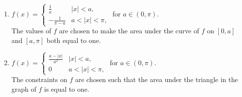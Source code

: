 \documentclass[../hw5]{subfiles}
\begin{document}
\begin{problem}
\begin{enumerate}
	\item $f(x)=\begin{cases}
			      \frac{1}{a} & |x|<a, \\ -\frac{1}{\pi-a} & a < |x| < \pi,
		      \end{cases}$ for $a \in (0,\pi)$. \\
	      The values of $f$ are chosen to make the area under the curve of $f$  on $[0,a]$ and  $[a,\pi]$ both equal to one.
	\item $f(x)=\begin{cases}
			      \frac{a- |x|}{a^2} & |x|<a, \\ 0 & a < |x| < \pi,
		      \end{cases}$ for $a \in (0,\pi)$. \\
	      The constraints on $f$ are chosen such that the area under the triangle in the graph of $f$ is equal to one.
\end{enumerate}
\end{problem}
\end{document}
